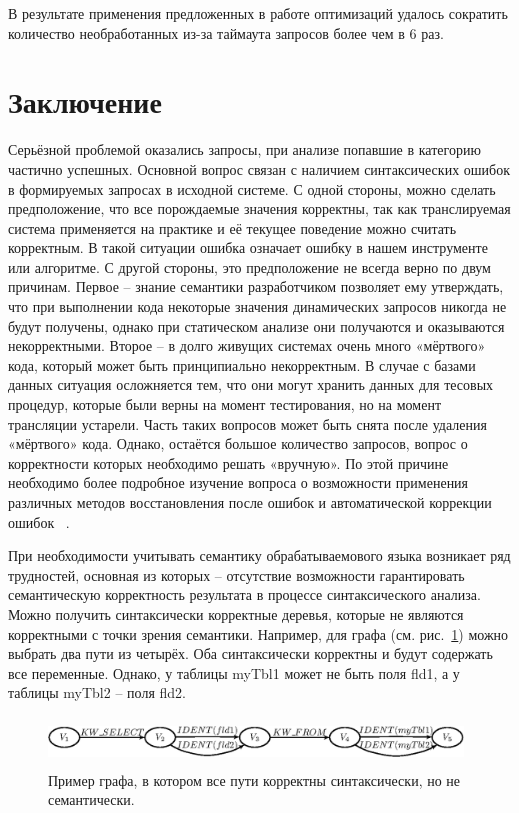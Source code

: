 \documentclass[a5paper]{article}
\begin{document}
В результате применения предложенных в работе оптимизаций удалось сократить количество необработанных из-за таймаута запросов более чем в 6 раз. 


\section*{Заключение}

Серьёзной проблемой оказались запросы, при анализе попавшие в категорию частично успешных. Основной вопрос связан с наличием синтаксических ошибок в формируемых запросах в исходной системе. С одной стороны, можно сделать предположение, что все порождаемые значения корректны, так как транслируемая система применяется на практике и её текущее поведение можно считать корректным. В такой ситуации ошибка означает ошибку в нашем инструменте или алгоритме. С другой стороны, это предположение не всегда верно по двум причинам. Первое -- знание семантики разработчиком позволяет ему утверждать, что при выполнении кода некоторые значения динамических запросов никогда не будут получены, однако при статическом анализе они получаются и оказываются некорректными. Второе -- в долго живущих системах очень много «мёртвого» кода, который может быть принципиально некорректным. В случае с базами данных ситуация осложняется тем, что они могут хранить данных для тесовых процедур, которые были верны на момент тестирования, но на момент трансляции устарели. Часть таких вопросов может быть снята после удаления «мёртвого» кода. Однако, остаётся большое количество запросов, вопрос о корректности которых необходимо решать «вручную». По этой причине необходимо более подробное изучение вопроса о возможности применения различных методов восстановления после ошибок и автоматической коррекции ошибок ~\cite{RelaxedLALR}.

При необходимости учитывать семантику обрабатываемового языка возникает ряд трудностей, основная из которых -- отсутствие возможности гарантировать семантическую корректность результата в процессе синтаксического анализа. Можно получить синтаксически корректные деревья, которые не являются корректными с точки зрения семантики. Например, для графа (см. рис.~\ref{pic7}) можно выбрать два пути из четырёх. Оба синтаксически корректны и будут содержать все переменные. Однако, у таблицы myTbl1  может не быть поля fld1, а у таблицы  myTbl2 -- поля fld2.

\begin{figure}
    \begin{center}
        \includegraphics[width=11cm,height=1.3cm]{graphs/semantics_example.eps}
        \caption{ Пример графа, в котором все пути корректны синтаксически, но не семантически.}
        \label{pic7}
    \end{center}
\end{figure}
\end{document}
